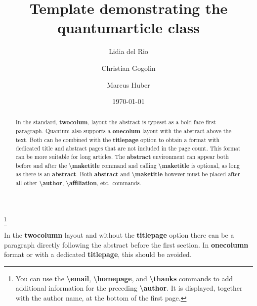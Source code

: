 \documentclass[prx,a4paper,aps,twocolumn,superscriptaddress,11p]{quantumarticle}
\begin{document}
\title{Template demonstrating the quantumarticle class}
\date{\today}
\author{Lidia del Rio}
\author{Christian Gogolin}
\thanks{You can use the \textbf{\textbackslash{}email}, \textbf{\textbackslash{}homepage}, and \textbf{\textbackslash{}thanks} commands to add additional information for the preceding \textbf{\textbackslash{}author}. It is displayed, together with the author name, at the bottom of the first page.}
\author{Marcus Huber}

\maketitle

\begin{abstract}
  In the standard, \textbf{twocolum}, layout the abstract is typeset as a bold face first paragraph.
  Quantum also supports a \textbf{onecolum} layout with the abstract above the text.
  Both can be combined with the \textbf{titlepage} option to obtain a format with dedicated title and abstract pages that are not included in the page count. 
  This format can be more suitable for long articles.
  The \textbf{abstract} environment can appear both before and after the \textbf{\textbackslash{}maketitle} command and calling \textbf{\textbackslash{}maketitle} is optional, as long as there is an \textbf{abstract}.
  Both \textbf{abstract} and \textbf{\textbackslash{}maketitle} however must be placed after all other \textbf{\textbackslash{}author}, \textbf{\textbackslash{}affiliation}, etc.\ commands.
\end{abstract}


In the \textbf{twocolumn} layout and without the \textbf{titlepage} option there can be a paragraph directly following the abstract before the first section.
In \textbf{onecolumn} format or with a dedicated \textbf{titlepage}, this should be avoided.
\end{document}
